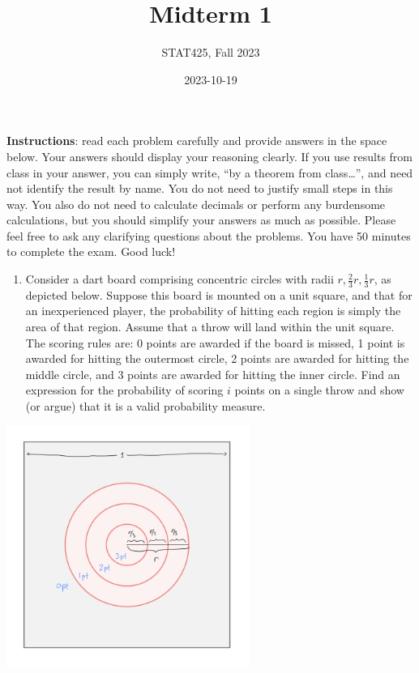 \documentclass[
  letterpaper,
  DIV=11,
  numbers=noendperiod]{scrartcl}
\title{Midterm 1}
\author{STAT425, Fall 2023}
\date{2023-10-19}
\providecommand{\tightlist}{%
  \setlength{\itemsep}{0pt}\setlength{\parskip}{0pt}}\usepackage{longtable,booktabs,array}
\begin{document}
\maketitle

\pagestyle{fancy}  

\textbf{Instructions}: read each problem carefully and provide answers
in the space below. Your answers should display your reasoning clearly.
If you use results from class in your answer, you can simply write, ``by
a theorem from class\ldots{}'', and need not identify the result by
name. You do not need to justify small steps in this way. You also do
not need to calculate decimals or perform any burdensome calculations,
but you should simplify your answers as much as possible. Please feel
free to ask any clarifying questions about the problems. You have 50
minutes to complete the exam. Good luck!

\begin{enumerate}
\def\labelenumi{\arabic{enumi}.}
\tightlist
\item
  Consider a dart board comprising concentric circles with radii
  \(r, \frac{2}{3}r, \frac{1}{3}r\), as depicted below. Suppose this
  board is mounted on a unit square, and that for an inexperienced
  player, the probability of hitting each region is simply the area of
  that region. Assume that a throw will land within the unit square. The
  scoring rules are: 0 points are awarded if the board is missed, 1
  point is awarded for hitting the outermost circle, 2 points are
  awarded for hitting the middle circle, and 3 points are awarded for
  hitting the inner circle. Find an expression for the probability of
  scoring \(i\) points on a single throw and show (or argue) that it is
  a valid probability measure.
\end{enumerate}

\begin{center}
\includegraphics[width=3.125in,height=\textheight]{Dartboard.png}
\end{center}
\end{document}
